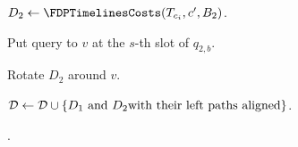 \begin{algorithm}
{{{            

            $D_2\gets \FDPTimelinesCosts\br{T_{c_i}, c', B_2}$.

            
            Put query to $v$ at the $s$-th slot of $q_{2,b}$.

            Rotate $D_2$ around $v$.

            $\mathcal{D}\gets\mathcal{D}\cup\mathopen{}\left\{ D_1 \text{ and } D_2 \text{with their left paths aligned} \right\}$.
        }
    }
    .
    }

\end{algorithm}
